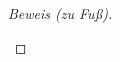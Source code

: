 \begin{proof}[Beweis (zu Fuß)]
\begin{enumerate}[label = (\roman*)]
    \end{enumerate}

\end{proof}
